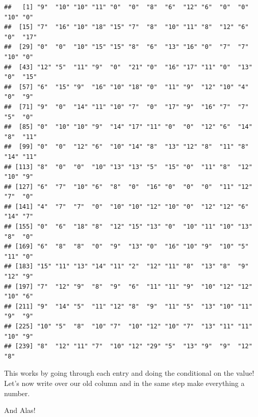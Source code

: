 \documentclass[]{book}
\newenvironment{Shaded}{\begin{snugshade}}{\end{snugshade}}
\newcommand{\KeywordTok}[1]{\textcolor[rgb]{0.13,0.29,0.53}{\textbf{#1}}}
\newcommand{\StringTok}[1]{\textcolor[rgb]{0.31,0.60,0.02}{#1}}
\newcommand{\OperatorTok}[1]{\textcolor[rgb]{0.81,0.36,0.00}{\textbf{#1}}}
\newcommand{\NormalTok}[1]{#1}
\theoremstyle{definition}
\theoremstyle{definition}
\theoremstyle{definition}
\theoremstyle{remark}
\begin{document}
\begin{verbatim}
##   [1] "9"  "10" "10" "11" "0"  "0"  "8"  "6"  "12" "6"  "0"  "0"  "10" "0" 
##  [15] "7"  "16" "10" "18" "15" "7"  "8"  "10" "11" "8"  "12" "6"  "0"  "17"
##  [29] "0"  "0"  "10" "15" "15" "8"  "6"  "13" "16" "0"  "7"  "7"  "10" "0" 
##  [43] "12" "5"  "11" "9"  "0"  "21" "0"  "16" "17" "11" "0"  "13" "0"  "15"
##  [57] "6"  "15" "9"  "16" "10" "18" "0"  "11" "9"  "12" "10" "4"  "0"  "9" 
##  [71] "9"  "0"  "14" "11" "10" "7"  "0"  "17" "9"  "16" "7"  "7"  "5"  "0" 
##  [85] "0"  "10" "10" "9"  "14" "17" "11" "0"  "0"  "12" "6"  "14" "8"  "11"
##  [99] "0"  "0"  "12" "6"  "10" "14" "8"  "13" "12" "8"  "11" "8"  "14" "11"
## [113] "8"  "0"  "0"  "10" "13" "13" "5"  "15" "0"  "11" "8"  "12" "10" "9" 
## [127] "6"  "7"  "10" "6"  "8"  "0"  "16" "0"  "0"  "0"  "11" "12" "7"  "0" 
## [141] "4"  "7"  "7"  "0"  "10" "10" "12" "10" "0"  "12" "12" "6"  "14" "7" 
## [155] "0"  "6"  "18" "8"  "12" "15" "13" "0"  "10" "11" "10" "13" "8"  "0" 
## [169] "6"  "8"  "8"  "0"  "9"  "13" "0"  "16" "10" "9"  "10" "5"  "11" "0" 
## [183] "15" "11" "13" "14" "11" "2"  "12" "11" "8"  "13" "8"  "9"  "12" "9" 
## [197] "7"  "12" "9"  "8"  "9"  "6"  "11" "11" "9"  "10" "12" "12" "10" "6" 
## [211] "9"  "14" "5"  "11" "12" "8"  "9"  "11" "5"  "13" "10" "11" "9"  "9" 
## [225] "10" "5"  "8"  "10" "7"  "10" "12" "10" "7"  "13" "11" "11" "10" "9" 
## [239] "8"  "12" "11" "7"  "10" "12" "29" "5"  "13" "9"  "9"  "12" "8"
\end{verbatim}

This works by going through each entry and doing the conditional on the
value! Let's now write over our old column and in the same step make
everything a number.

\begin{Shaded}
\end{Shaded}

And Alas!

\begin{Shaded}
\end{Shaded}
\end{document}
